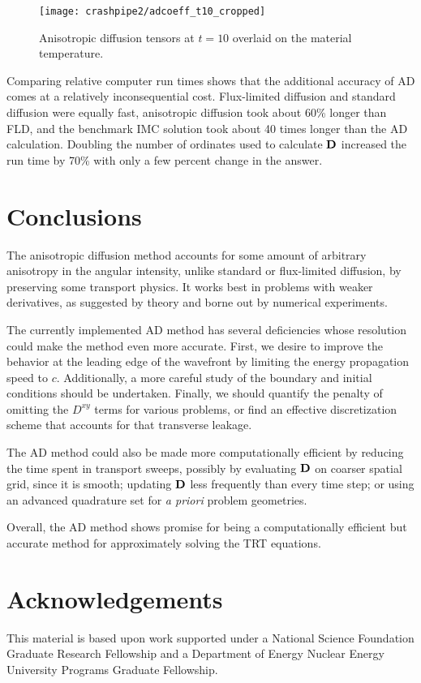 \documentclass[11pt,letter,twoside]{mc2011}
\newcommand{\Dtens}{\mat{D}}
\begin{document}
\begin{figure}[htb]
  \centering
  \texttt{[image: crashpipe2/adcoeff\_t10\_cropped]}
  \caption{Anisotropic diffusion tensors at $t=10$ overlaid on the material
  temperature.}
  \label{fig:adcoeff}
\end{figure}

Comparing relative computer run times shows that the additional accuracy of
AD comes at a relatively inconsequential cost. Flux-limited diffusion and
standard diffusion were
equally fast, anisotropic diffusion took about 60\% longer than FLD, and the
benchmark IMC solution took about 40 times longer than the AD calculation.
Doubling the number of ordinates used to calculate $\Dtens$ increased the run
time by 70\% with only a few percent change in the answer.
\clearpage
\section{Conclusions}
The anisotropic diffusion method accounts for some amount of arbitrary
anisotropy in the angular intensity, unlike standard or flux-limited diffusion,
by preserving some transport physics. It works best in problems with weaker
derivatives, as suggested by theory and borne out by numerical experiments.

The currently implemented AD method has several deficiencies whose resolution
could make the method even more accurate. First, we desire to improve the
behavior at the leading edge of the wavefront by limiting the energy
propagation speed to $c$. Additionally, a more careful study of the boundary
and initial conditions should be undertaken. Finally, we should quantify the
penalty of omitting the $D^{xy}$ terms for various problems, or find an
effective discretization scheme that accounts for that transverse leakage.

The AD method could also be made
more computationally efficient by reducing the time spent in transport sweeps,
possibly by
evaluating $\Dtens$ on coarser spatial grid, since it is smooth;
updating $\Dtens$ less frequently than every time step; or
using an advanced quadrature set for \emph{a priori} problem geometries.

Overall, the AD method shows promise for being a computationally efficient
but accurate method for approximately solving the TRT equations.

\section*{Acknowledgements}
This material is based upon work supported under a National Science Foundation
Graduate Research Fellowship and a Department of Energy Nuclear
Energy University Programs Graduate Fellowship.




\end{document}
